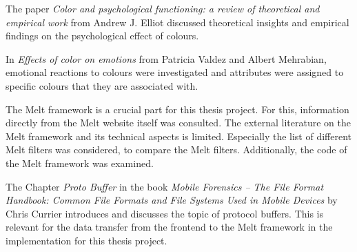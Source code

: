 \documentclass[../MasterThesis.tex]{subfiles}
\begin{document}
\begin{description}[font=\color{RedViolet!80!black}, style=nextline]
		\item[Effects of different colour]
		
		
		The paper \textit{Color and psychological functioning: a review of theoretical and empirical work} from Andrew J. Elliot discussed theoretical insights and empirical findings on the psychological effect of colours.~\cite{colour}
		
		
		In \textit{Effects of color on emotions} from Patricia Valdez and Albert Mehrabian, emotional reactions to colours were investigated and attributes were assigned to specific colours that they are associated with.~\cite{colour2}
	
		
		
		\item[Melt framework]
		
		
		The Melt framework is a crucial part for this thesis project. For this, information directly from the Melt website itself was consulted. The external literature on the Melt framework and its technical aspects is limited. Especially the list of different Melt filters was considered, to compare the Melt filters. Additionally, the code of the Melt framework was examined.~\cite{melt, melt_filters, melt_code}

		
	
		
		
		\item[Protocol buffer] 
		
		The Chapter \textit{Proto Buffer} in the book \textit{Mobile Forensics -- The File Format Handbook: Common File Formats and File Systems Used in Mobile Devices} by Chris Currier introduces and discusses the topic of protocol buffers. This is relevant for the data transfer from the frontend to the Melt framework in the implementation for this thesis project.~\cite{protobuffer}
		
		
		
		
				
		
		
		\item[Multimedia processing] 
		

\end{description}
\end{document}
